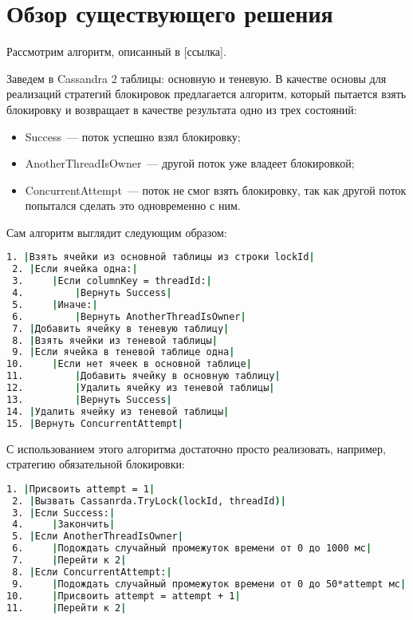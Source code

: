\section{Обзор существующего решения}

Рассмотрим алгоритм, описанный в [ссылка].

Заведем в Cassandra 2 таблицы: основную и теневую. В качестве основы для реализаций стратегий блокировок предлагается алгоритм, который пытается взять блокировку и возвращает в качестве результата одно из трех состояний:

\begin{itemize}
	\item Success~--- поток успешно взял блокировку;
	\item AnotherThreadIsOwner~--- другой поток уже владеет блокировкой;
	\item ConcurrentAttempt~--- поток не смог взять блокировку, так как другой поток попытался сделать это одновременно с ним.
\end{itemize}

Сам алгоритм выглядит следующим образом:


\begin{lstlisting}[language=csh,caption={Алгоритм Cassandra.TryLock(lockId, threadId)}]
 1. |Взять ячейки из основной таблицы из строки lockId|
 2. |Если ячейка одна:|
 3. 	|Если columnKey = threadId:|
 4. 		|Вернуть Success|
 5. 	|Иначе:|
 6. 		|Вернуть AnotherThreadIsOwner|
 7. |Добавить ячейку в теневую таблицу|
 8. |Взять ячейки из теневой таблицы|
 9. |Если ячейка в теневой таблице одна|
10. 	|Если нет ячеек в основной таблице|
11. 		|Добавить ячейку в основную таблицу|
12. 		|Удалить ячейку из теневой таблицы|
13. 		|Вернуть Success|
14. |Удалить ячейку из теневой таблицы|
15. |Вернуть ConcurrentAttempt|
\end{lstlisting}

С использованием этого алгоритма достаточно просто реализовать, например, стратегию обязательной блокировки:

\begin{lstlisting}[language=csh,caption={Алгоритм Cassandra.GetLock(lockId, threadId)}]
 1. |Присвоить attempt = 1|
 2. |Вызвать Cassanrda.TryLock(lockId, threadId)|
 3. |Если Success:|
 4. 	|Закончить|
 5. |Если AnotherThreadIsOwner|
 6. 	|Подождать случайный промежуток времени от 0 до 1000 мс|
 7. 	|Перейти к 2|
 8. |Если ConcurrentAttempt:|
 9. 	|Подождать случайный промежуток времени от 0 до 50*attempt мс|
10. 	|Присвоить attempt = attempt + 1|
11. 	|Перейти к 2|
\end{lstlisting}

